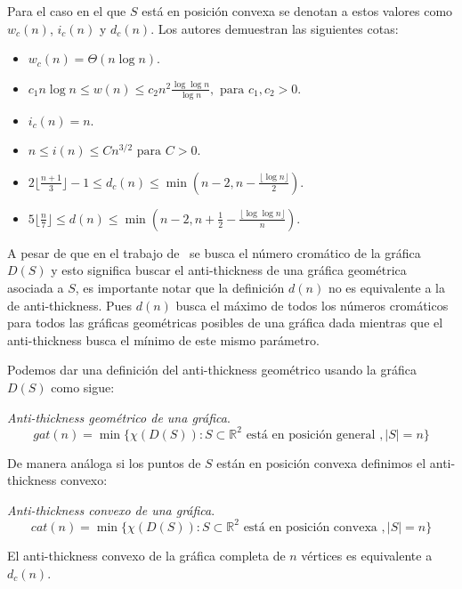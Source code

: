 Para el caso en el que $S$ está en posición convexa se denotan a estos valores como
$w_c(n)$, $i_c(n)$ y $d_c(n)$. Los autores demuestran las siguientes cotas:
\begin{itemize}
  \item $w_c(n) = \Theta(n\log n)$.
  \item $c_1n\log n \leq w(n) \leq c_2 n^2 \frac{\log\log n}{\log n}, \text{ para } c_1,c_2 > 0$.
  \item $i_c(n) = n$.
  \item $n \leq i(n) \leq Cn^{3/2} \text{ para } C > 0$.
  \item $2\lfloor \frac{n+1}{3}\rfloor -1 \leq d_c(n) \leq \min\left( n-2, n - \frac{\lfloor{\log n}\rfloor}{2}\right)$.
  \item $5\lfloor \frac{n}{7}\rfloor \leq d(n) \leq \min\left(n-2,n+\frac{1}{2}- \frac{\lfloor{\log \log n}\rfloor}{n}\right)$.
\end{itemize}

A pesar de que en el trabajo de~\cite{Araujo2005} se busca el número cromático
de la gráfica $D(S)$ y esto significa buscar el anti-thickness de una gráfica
geométrica asociada a $S$, es importante notar que la definición $d(n)$ no es
equivalente a la de anti-thickness. Pues $d(n)$ busca el máximo de todos los
números cromáticos para todos las gráficas geométricas posibles de una gráfica
dada mientras que el anti-thickness busca el mínimo de este mismo parámetro.

Podemos dar una definición del anti-thickness geométrico usando la gráfica $D(S)$
como sigue:
\begin{definition}{\emph{Anti-thickness geométrico de una gráfica}.}
  \[gat(n) = \min\{\chi(D(S)): S\subset \mathbb{R}^2 \text{ está en posición general }, |S|=n\}\]
\end{definition}

De manera análoga si los puntos de $S$ están en posición convexa definimos el
anti-thickness convexo:

\begin{definition}{\emph{Anti-thickness convexo de una gráfica}.}
  \[cat(n) = \min\{\chi(D(S)): S\subset \mathbb{R}^2 \text{ está en posición convexa }, |S|=n\}\]
\end{definition}

El anti-thickness convexo de la gráfica completa de $n$ vértices es equivalente
a $d_c(n)$.

